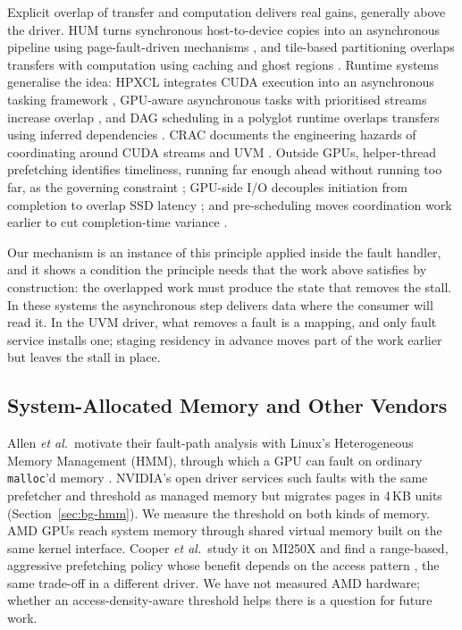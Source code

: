 Explicit overlap of transfer and computation delivers real gains, generally
above the driver. HUM turns synchronous host-to-device copies into an
asynchronous pipeline using page-fault-driven mechanisms \cite{jung2020hum},
and tile-based partitioning overlaps transfers with computation using caching
and ghost regions \cite{bastem2017tiles}. Runtime systems generalise the idea:
HPXCL integrates CUDA execution into an asynchronous tasking framework
\cite{diehl2018hpxcl}, GPU-aware asynchronous tasks with prioritised streams
increase overlap \cite{choi2022gpuaware}, and DAG scheduling in a polyglot
runtime overlaps transfers using inferred dependencies
\cite{parravicini2021dagpolyglot}. CRAC documents the engineering hazards of
coordinating around CUDA streams and UVM \cite{jain2020crac}. Outside GPUs,
helper-thread prefetching identifies timeliness, running far enough ahead
without running too far, as the governing constraint \cite{guo2025ghost};
GPU-side I/O decouples initiation from completion to overlap SSD latency
\cite{han2026agio}; and pre-scheduling moves coordination work earlier to cut
completion-time variance \cite{jin2019prescheduling}.

Our mechanism is an instance of this principle applied inside the fault
handler, and it shows a condition the principle needs that the work above
satisfies by construction: the overlapped work must produce the state that
removes the stall. In these systems the asynchronous step delivers data where
the consumer will read it. In the UVM driver, what removes a fault is a mapping,
and only fault service installs one; staging residency in advance moves part of
the work earlier but leaves the stall in place.

\subsection{System-Allocated Memory and Other Vendors}

Allen \emph{et al.}\ motivate their fault-path analysis with Linux's
Heterogeneous Memory Management (HMM), through which a GPU can fault on
ordinary \texttt{malloc}'d memory \cite{allen2024finegrain}. NVIDIA's open
driver services such faults with the same prefetcher and threshold as managed
memory but migrates pages in 4\,KB units (Section~\ref{sec:bg-hmm}). We measure
the threshold on both kinds of memory. AMD GPUs reach system memory through
shared virtual memory built on the same kernel interface. Cooper \emph{et al.}\
study it on MI250X and find a range-based, aggressive prefetching policy whose
benefit depends on the access pattern \cite{cooper2024svm}, the same trade-off
in a different driver. We have not measured AMD hardware; whether an
access-density-aware threshold helps there is a question for future work.

